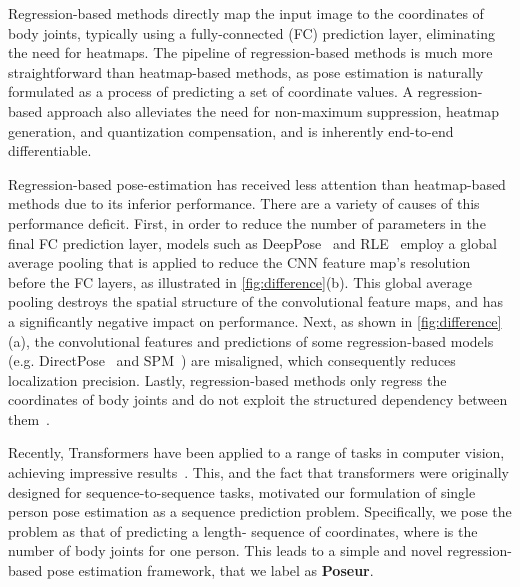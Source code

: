 \documentclass[runningheads]{llncs}
\def\handle{{Poseur}\xspace}
\begin{document}
Regression-based methods directly map the input image to the coordinates of body joints, typically using a fully-connected (FC) prediction layer, eliminating the need for heatmaps. The pipeline of regression-based methods is much more {straightforward} than heatmap-based methods, as pose estimation is 
naturally
formulated
as a process of predicting a set of 
coordinate values. 
A regression-based approach also alleviates the need for non-maximum suppression, heatmap generation, and quantization compensation, and is inherently end-to-end differentiable.


Regression-based pose-estimation has received less attention than heatmap-based methods due to its inferior performance. 
There are a variety of causes of this performance deficit. First, in order to reduce the number of parameters in the
final FC
prediction layer, models such as DeepPose~\cite{2014deeppose} and RLE~\cite{li2021rle}
employ 
a global average pooling that is applied to reduce the CNN feature map's resolution before the FC layers, as illustrated in \cref{fig:difference}(b).
This global average pooling destroys the spatial structure of the convolutional feature maps, and has a significantly negative impact on performance. Next, as shown in \cref{fig:difference}(a), the convolutional features and predictions of some regression-based models (e.g.  DirectPose~\cite{tian2019directpose} and SPM~\cite{nie2019single}) are misaligned, which consequently reduces localization precision. Lastly, regression-based methods only regress the coordinates of body joints and do not exploit the structured dependency between them~\cite{sun2017compositional}. 




Recently, Transformers have been applied to a range of tasks in computer vision, achieving impressive results~\cite{zhu2020deformable,dosovitskiy2020image,carion2020end}. This, and the fact that transformers were originally designed for sequence-to-sequence tasks, motivated our formulation of single person pose estimation as a sequence prediction problem.  Specifically, we pose the problem as that of predicting a length- sequence of coordinates, where  is the number of body joints for one person. This leads to a simple and novel regression-based pose estimation framework, that we label as \textbf{\handle}.
\end{document}
